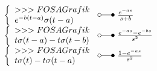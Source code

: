 \[\begin{array}{@{}l@{ ~ \laplace ~ }l@{}}
\left\lbrace\begin{array}{l}
>>>FOSA Grafik \\
e^{-b(t - a)} \sigma(t - a) \\
\end{array}\right. &
    \frac{e^{-as}}{s + b} \\
\left\lbrace\begin{array}{l}
>>>FOSA Grafik \\
t \sigma(t - a) - t \sigma(t - b) \\
\end{array}\right. &
    \frac{e^{-as} - e^{-bs}}{s^2} \\
\left\lbrace\begin{array}{l}
>>>FOSA Grafik \\
t \sigma(t) - t \sigma(t - a) \\
\end{array}\right. &
    \frac{1 - e^{-as}}{s^2}
\end{array} \]

